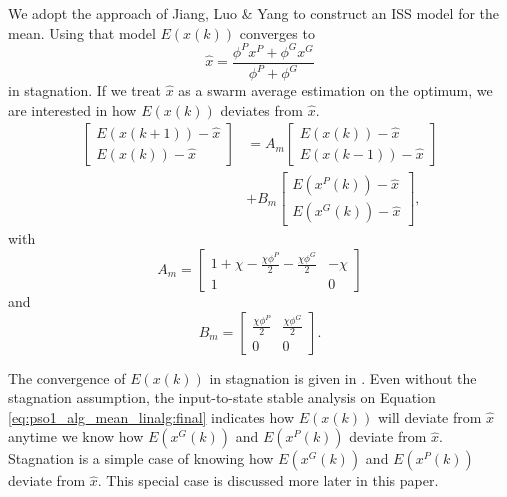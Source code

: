 \documentclass{sig-alternate}
\begin{document}
We adopt the approach of Jiang, Luo \& Yang \cite{Jiang20078} to construct an ISS model for the mean.
Using that model $ E( x(k) ) $ converges to 
\begin{equation}
\nonumber
\hat{x} = \frac{\phi^{P} x^{P} + \phi^{G} x^{G} }{ \phi^{P} + \phi^{G} } 
\end{equation}
in stagnation.
If we treat $ \hat{x} $ as a swarm average estimation on the optimum, we are interested in how $ E( x(k) ) $ deviates from $ \hat{x} $.
\begin{equation}
\label{eq:pso1_alg_mean_linalg:final}
\begin{aligned}
\begin{bmatrix}
E( x(k+1) ) - \hat{x} \\
E( x(k) ) - \hat{x}
\end{bmatrix}
& = 
A_{m}
\begin{bmatrix}
E( x(k) ) - \hat{x} \\
E( x(k-1) ) - \hat{x}
\end{bmatrix}
\\ & +
B_{m}
\begin{bmatrix}
E( x^{P}(k) ) - \hat{x}\\
E( x^{G}(k) ) - \hat{x}
\end{bmatrix},
\end{aligned}
\end{equation}
with 
\begin{equation}
\nonumber
A_{m} = \begin{bmatrix}
1 + \chi - \frac{ \chi \phi^{P} }{2} - \frac{ \chi \phi^{G} }{2} & -\chi \\
1 & 0
\end{bmatrix}
\end{equation}
and
\begin{equation}
\nonumber
B_{m} = \begin{bmatrix}
\frac{ \chi \phi^{P} }{2} & \frac{ \chi \phi^{G} }{2} \\
0 & 0
\end{bmatrix}.
\end{equation}

The convergence of $ E( x(k) ) $ in stagnation is given in \cite{Jiang20078,Poli:2008:DSS:1384929.1384944}.
Even without the stagnation assumption, 
the input-to-state stable analysis on Equation \eqref{eq:pso1_alg_mean_linalg:final} indicates how $ E(x(k)) $ will deviate from $ \hat{x} $ anytime we know how $ E( x^{G}(k) ) $ and $ E( x^{P}(k) ) $ deviate from $ \hat{x} $. Stagnation is a simple case of knowing how $ E( x^{G}(k) ) $ and $ E( x^{P}(k) ) $ deviate from $ \hat{x} $. This special case is discussed more later in this paper.
\end{document}
